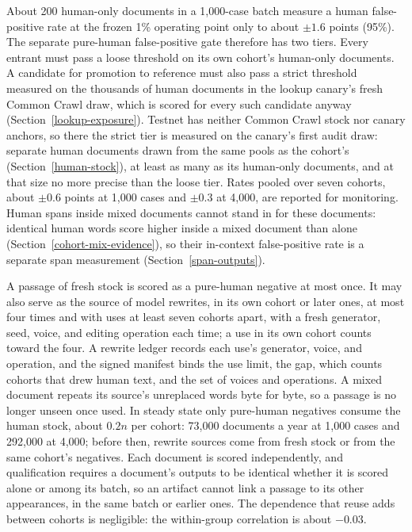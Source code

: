 About 200 human-only documents in a 1,000-case batch measure a human
false-positive rate at the frozen 1\% operating point only to about \(\pm1.6\)
points (95\%). The separate pure-human false-positive gate therefore has two
tiers. Every entrant must pass a loose threshold on its own cohort's human-only
documents. A candidate for promotion to reference must also pass a strict
threshold measured on the thousands of human documents in the lookup canary's
fresh Common Crawl draw, which is scored for every such candidate anyway
(Section~\ref{lookup-exposure}). Testnet has neither Common Crawl stock nor
canary anchors, so there the strict tier is measured on the canary's first audit
draw: separate human documents drawn from the same pools as the cohort's
(Section~\ref{human-stock}), at least as many as its human-only documents, and
at that size no more precise than the loose tier. Rates pooled over seven cohorts, about
\(\pm0.6\) points at 1,000 cases and \(\pm0.3\) at 4,000, are reported for
monitoring. Human spans inside mixed documents cannot stand in for these documents:
identical human words score higher inside a mixed document than alone
(Section~\ref{cohort-mix-evidence}), so their in-context false-positive rate is
a separate span measurement (Section~\ref{span-outputs}).

A passage of fresh stock is scored as a pure-human negative at most once. It may also
serve as the source of model rewrites, in its own cohort or later ones, at most
four times and with uses at least seven cohorts apart, with a fresh generator,
seed, voice, and editing operation each time; a use in its own cohort counts
toward the four. A rewrite ledger records each use's generator, voice, and
operation, and the signed manifest binds the use limit, the gap, which counts
cohorts that drew human text, and the set of voices and operations. A mixed document repeats its
source's unreplaced words byte for byte, so a passage is no longer unseen once
used. In steady state only pure-human negatives consume the human stock, about
\(0.2n\) per cohort: 73,000 documents a year at 1,000 cases and 292,000 at
4,000; before then, rewrite sources come from fresh stock or from the same
cohort's negatives. Each document is scored independently, and qualification
requires a document's outputs to be identical whether it is scored alone or
among its batch, so an artifact cannot link a passage to its other appearances,
in the same batch or earlier ones. The dependence that reuse adds between
cohorts is negligible: the within-group correlation is about \(-0.03\).

